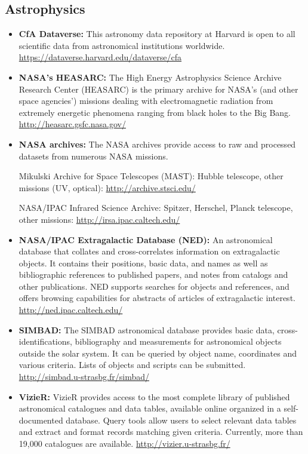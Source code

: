 \subsection{Astrophysics}\label{astrophysics}

\begin{itemize}
\item
  \textbf{CfA Dataverse:} This astronomy data repository at Harvard is
  open to all scientific data from astronomical institutions worldwide.
  \url{https://dataverse.harvard.edu/dataverse/cfa}
\item
  \textbf{NASA's HEASARC:} The High Energy Astrophysics Science Archive
  Research Center (HEASARC) is the primary archive for NASA's (and other
  space agencies') missions dealing with electromagnetic radiation from
  extremely energetic phenomena ranging from black holes to the Big
  Bang. \url{http://heasarc.gsfc.nasa.gov/}
\item
  \textbf{NASA archives:} The NASA archives provide access to raw and
  processed datasets from numerous NASA missions.

  Mikulski Archive for Space Telescopes (MAST): Hubble telescope, other
  missions (UV, optical): \url{http://archive.stsci.edu/}

  NASA/IPAC Infrared Science Archive: Spitzer, Herschel, Planck
  telescope, other missions: \url{http://irsa.ipac.caltech.edu/}
\item
  \textbf{NASA/IPAC Extragalactic Database (NED):} An astronomical
  database that collates and cross-correlates information on
  extragalactic objects. It contains their positions, basic data, and
  names as well as bibliographic references to published papers, and
  notes from catalogs and other publications. NED supports searches for
  objects and references, and offers browsing capabilities for abstracts
  of articles of extragalactic interest.
  \url{http://ned.ipac.caltech.edu/}
\item
  \textbf{SIMBAD:} The SIMBAD astronomical database provides basic data,
  cross-identifications, bibliography and measurements for astronomical
  objects outside the solar system. It can be queried by object name,
  coordinates and various criteria. Lists of objects and scripts can be
  submitted. \url{http://simbad.u-strasbg.fr/simbad/}
\item
  \textbf{VizieR:} VizieR provides access to the most complete library
  of published astronomical catalogues and data tables, available online
  organized in a self-documented database. Query tools allow users to
  select relevant data tables and extract and format records matching
  given criteria. Currently, more than 19,000 catalogues are available.
  \url{http://vizier.u-strasbg.fr/}
\end{itemize}

